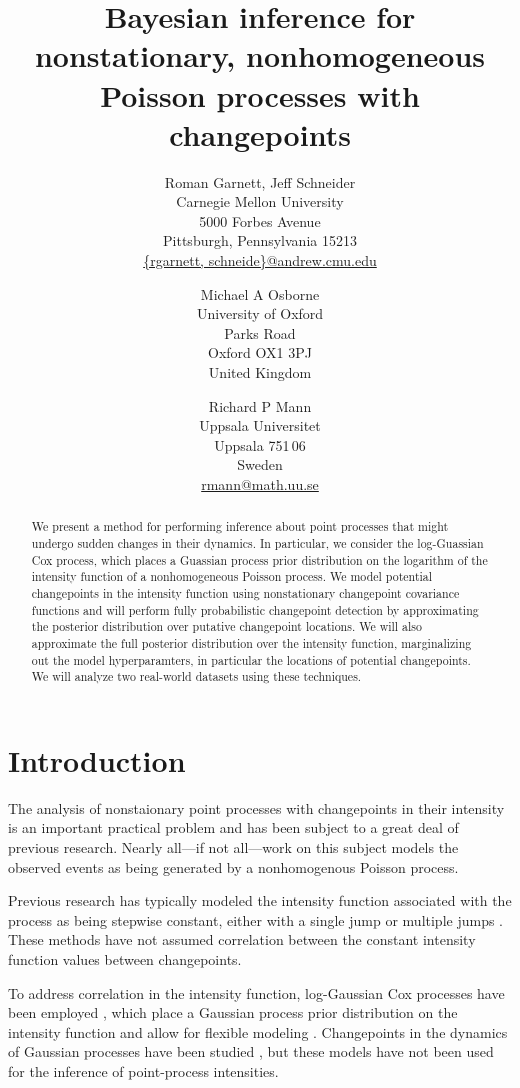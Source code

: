 \documentclass{article}
\title{Bayesian inference for nonstationary, nonhomogeneous Poisson
  processes with changepoints}
\author{
  Roman Garnett, Jeff Schneider\\
  {Carnegie Mellon University}\\
  {5000 Forbes Avenue}\\
  {Pittsburgh, Pennsylvania 15213}\\
  \url{{rgarnett, schneide}@andrew.cmu.edu}
  \and
  Michael A Osborne\\
  {University of Oxford}\\
  {Parks Road}\\
  {Oxford OX1 3PJ}\\
  {United Kingdom}\\
  \and
  Richard P Mann\\
  {Uppsala Universitet}\\
  {Uppsala 751\,06}\\
  {Sweden}\\
  \url{rmann@math.uu.se}
}
\begin{document}
\maketitle

\begin{abstract}
  We present a method for performing inference about point processes
  that might undergo sudden changes in their dynamics.  In particular,
  we consider the log-Guassian Cox process, which places a Guassian
  process prior distribution on the logarithm of the intensity
  function of a nonhomogeneous Poisson process.  We model potential
  changepoints in the intensity function using nonstationary
  changepoint covariance functions and will perform fully
  probabilistic changepoint detection by approximating the posterior
  distribution over putative changepoint locations.  We will also
  approximate the full posterior distribution over the intensity
  function, marginalizing out the model hyperparamters, in particular
  the locations of potential changepoints.  We will analyze two
  real-world datasets using these techniques.
\end{abstract}

\section{Introduction}

The analysis of nonstaionary point processes with changepoints in
their intensity is an important practical problem and has been subject
to a great deal of previous research.  Nearly all---if not all---work
on this subject models the observed events as being generated by a
nonhomogenous Poisson process.  

Previous research has typically modeled the intensity function
associated with the process as being stepwise constant, either with a
single jump \citep{rafteryakman, carlin, westogden} or multiple jumps
\citep{youngkuo, fearnhead, adamscp}.  These methods have not assumed
correlation between the constant intensity function values between
changepoints.

To address correlation in the intensity function, log-Gaussian Cox
processes have been employed \citep{moller}, which place a Gaussian
process prior distribution on the intensity function and allow for
flexible modeling \citep{gpml}.  Changepoints in the dynamics of
Gaussian processes have been studied \citep{cpcj, bocpd}, but these
models have not been used for the inference of point-process
intensities.
\end{document}
